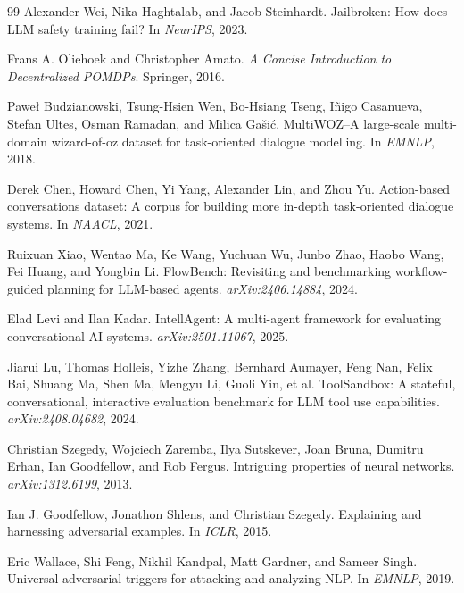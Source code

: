 \documentclass{article}
\begin{document}
\begin{thebibliography}{99}
Alexander Wei, Nika Haghtalab, and Jacob Steinhardt.
\newblock Jailbroken: How does LLM safety training fail?
\newblock In \emph{NeurIPS}, 2023.

Frans A. Oliehoek and Christopher Amato.
\newblock \emph{A Concise Introduction to Decentralized POMDPs}.
\newblock Springer, 2016.

Paweł Budzianowski, Tsung-Hsien Wen, Bo-Hsiang Tseng, Iñigo Casanueva, Stefan Ultes, Osman Ramadan, and Milica Gašić.
\newblock MultiWOZ--A large-scale multi-domain wizard-of-oz dataset for task-oriented dialogue modelling.
\newblock In \emph{EMNLP}, 2018.

Derek Chen, Howard Chen, Yi Yang, Alexander Lin, and Zhou Yu.
\newblock Action-based conversations dataset: A corpus for building more in-depth task-oriented dialogue systems.
\newblock In \emph{NAACL}, 2021.

Ruixuan Xiao, Wentao Ma, Ke Wang, Yuchuan Wu, Junbo Zhao, Haobo Wang, Fei Huang, and Yongbin Li.
\newblock FlowBench: Revisiting and benchmarking workflow-guided planning for LLM-based agents.
\newblock \emph{arXiv:2406.14884}, 2024.

Elad Levi and Ilan Kadar.
\newblock IntellAgent: A multi-agent framework for evaluating conversational AI systems.
\newblock \emph{arXiv:2501.11067}, 2025.

Jiarui Lu, Thomas Holleis, Yizhe Zhang, Bernhard Aumayer, Feng Nan, Felix Bai, Shuang Ma, Shen Ma, Mengyu Li, Guoli Yin, et al.
\newblock ToolSandbox: A stateful, conversational, interactive evaluation benchmark for LLM tool use capabilities.
\newblock \emph{arXiv:2408.04682}, 2024.

Christian Szegedy, Wojciech Zaremba, Ilya Sutskever, Joan Bruna, Dumitru Erhan, Ian Goodfellow, and Rob Fergus.
\newblock Intriguing properties of neural networks.
\newblock \emph{arXiv:1312.6199}, 2013.

Ian J. Goodfellow, Jonathon Shlens, and Christian Szegedy.
\newblock Explaining and harnessing adversarial examples.
\newblock In \emph{ICLR}, 2015.

Eric Wallace, Shi Feng, Nikhil Kandpal, Matt Gardner, and Sameer Singh.
\newblock Universal adversarial triggers for attacking and analyzing NLP.
\newblock In \emph{EMNLP}, 2019.


\end{thebibliography}
\end{document}
